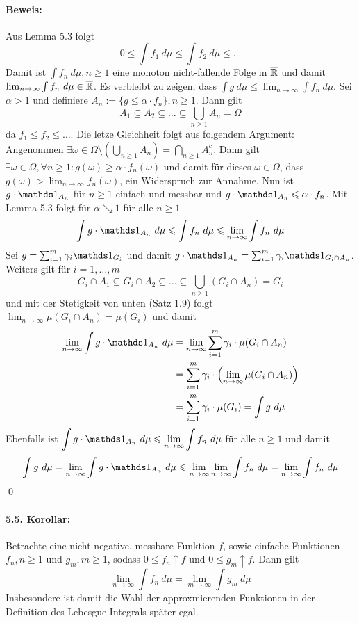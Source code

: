  \paragraph{Beweis:}Aus Lemma 5.3 folgt 
 $$0\leq\int f_1\ d\mu\leq\int f_2\ d\mu\leq\hdots$$
 Damit ist $\int f_n\ d\mu,n\geq1$ eine monoton nicht-fallende Folge in $\overline{\mathbb{R}}$ und damit $\lim_{n\to\infty}\int f_n\ d\mu\in\overline\R$. Es verbleibt zu zeigen, dass $\int g\ d\mu\leq\lim_{n\to\infty}\int f_n\ d\mu$. Sei $\alpha>1$ und definiere $A_n:=\{g\leq\alpha \cdot f_n\},n\geq1$. Dann gilt
 $$A_1\subseteq A_2\subseteq\hdots\subseteq\bigcup_{n\geq1}A_n=\Omega$$
 da $f_1\leq f_2\leq\hdots$. Die letze Gleichheit folgt aus folgendem Argument: \newline\newline
 Angenommen $\exists\omega\in\Omega\setminus\left(\bigcup_{n\geq1}A_n\right)=\bigcap_{n\geq1}A_n^c$. Dann gilt $\exists\omega\in\Omega,\forall n\geq1:g(\omega)\geq\alpha \cdot f_n(\omega)$ und damit f\"ur dieses $\omega\in\Omega$, dass $g(\omega)>\displaystyle\lim_{n\to\infty}f_n(\omega)$, ein Widerspruch zur Annahme.\newline\newline
 Nun ist $g\cdot\ind{A_n}$ f\"ur $n\geq1$ einfach und messbar und $g\cdot\ind{A_n}\leq\alpha\cdot f_n$. Mit Lemma 5.3 folgt f\"ur $\alpha\searrow1$ f\"ur alle $n\geq1$
 $$\int g\cdot\ind{A_n}\ d\mu\leq\int f_n\ d\mu\leq\lim_{n\to\infty}\int f_n\ d\mu$$
 Sei $g=\sum_{i=1}^m\gamma_i\ind{G_i}$ und damit $g\cdot\ind{A_n}=\sum_{i=1}^m\gamma_i\ind{G_i\cap A_n}$. Weiters gilt f\"ur $i=1,\hdots,m$
 $$G_i\cap A_1\subseteq G_i\cap A_2\subseteq\hdots\subseteq\bigcup_{n\geq1}(G_i\cap A_n)=G_i$$
 und mit der Stetigkeit von unten (Satz 1.9) folgt $\displaystyle\lim_{n\to\infty}\mu(G_i\cap A_n)=\mu(G_i)$ und damit
 \begin{align*}
     \lim_{n\to\infty}\int g\cdot\ind{A_n}\ d\mu&=\lim_{n\to\infty}\sum_{i=1}^m\gamma_i\cdot\mu(G_i\cap A_n)\\&=\sum_{i=1}^m\gamma_i\cdot\left(\lim_{n\to\infty}\mu(G_i\cap A_n)\right)\\&=\sum_{i=1}^m\gamma_i\cdot\mu(G_i)=\int g\ d\mu
 \end{align*}
 Ebenfalls ist $\displaystyle\int g\cdot\ind{A_n}\ d\mu\leq\lim_{n\to\infty}\int f_n\ d\mu$ f\"ur alle $n\geq1$ und damit
 $$\int g\ d\mu=\lim_{n\to\infty}\int g\cdot\ind{A_n}\ d\mu\leq\lim_{n\to\infty}\lim_{n\to\infty}\int f_n\ d\mu=\lim_{n\to\infty}\int f_n\ d\mu$$
 \qed
 
 \paragraph{5.5. Korollar:}Betrachte eine nicht-negative, messbare Funktion $f$, sowie einfache Funktionen $f_n,n\geq1$ und $g_m,m\geq1$, sodass $0\leq f_n\uparrow f\text{ und }0\leq g_m\uparrow f$. Dann gilt 
 $$\displaystyle\lim_{n\to\infty}\int f_n\ d\mu=\lim_{m\to\infty}\int g_m\ d\mu$$
 Insbesondere ist damit die Wahl der approxmierenden Funktionen in der Definition des Lebesgue-Integrals sp\"ater egal.
 

